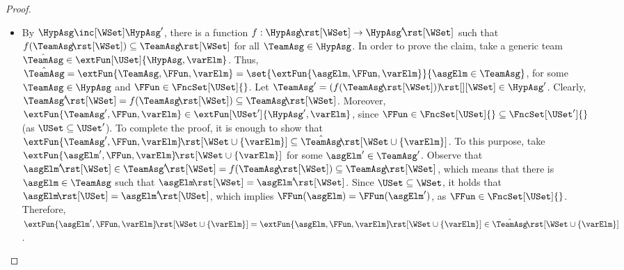 \documentclass[authoryear]{elsarticle}
\begin{document}
\begin{proof}
\begin{itemize}
  \item[\ref{lmm:mon(ext:dep)})]
    By $\HypAsg \inc[\WSet] \HypAsg'$, there is a function $f : \HypAsg
    \!\rst[\WSet] \rightarrow \HypAsg' \!\rst[\WSet]$ such that $f(\TeamAsg
    \!\rst[\WSet]) \subseteq \TeamAsg \!\rst[\WSet]$ for all $\TeamAsg \in
    \HypAsg$.
%
    In order to prove the claim, take a generic team $\hat{\TeamAsg} \in
    \extFun[\USet]{\HypAsg, \varElm}$.
    Thus, $\hat{\TeamAsg} = \extFun{\TeamAsg, \FFun, \varElm} =
    \set{\extFun{\asgElm, \FFun, \varElm}}{{ \asgElm \in \TeamAsg }}$, for some
    $\TeamAsg \in \HypAsg$ and $\FFun \in \FncSet[\USet]{}$.
%
    Let $\TeamAsg' = \asgExtW{(f(\TeamAsg \!\rst[\WSet]))} \in \HypAsg'$.
    Clearly, $\TeamAsg' \!\rst[\WSet] = f(\TeamAsg \!\rst[\WSet]) \subseteq
    \TeamAsg \!\rst[\WSet]$.
    Moreover, $\extFun{\TeamAsg', \FFun, \varElm} \in \extFun[\USet']{\HypAsg',
      \varElm}$, since $\FFun \in \FncSet[\USet]{} \subseteq \FncSet[\USet']{}$
    (as $\USet \subseteq \USet'$).
%
    To complete the proof, it is enough to show that $\extFun{\TeamAsg', \FFun,
      \varElm} \!\rst[\WSet \cup \{ \varElm \}] \subseteq \hat{\TeamAsg}
    \!\rst[\WSet \cup \{ \varElm \}]$.
    To this purpose, take $\extFun{\asgElm', \FFun, \varElm} \!\rst[\WSet \cup
    \{ \varElm \}]$ for some $\asgElm' \in \TeamAsg'$.
    Observe that $\asgElm' \!\rst[\WSet] \in \TeamAsg' \!\rst[\WSet] =
    f(\TeamAsg \!\rst[\WSet]) \subseteq \TeamAsg \!\rst[\WSet]$, which means
    that there is $\asgElm \in \TeamAsg$ such that $\asgElm \!\rst[\WSet] =
    \asgElm' \!\rst[\WSet]$.
    Since $\USet \subseteq \WSet$, it holds that $\asgElm \!\rst[\USet] =
    \asgElm' \!\rst[\USet]$, which implies $\FFun(\asgElm) = \FFun(\asgElm')$,
    as $\FFun \in \FncSet[\USet]{}$.
    Therefore, $\extFun{\asgElm', \FFun, \varElm} \!\rst[\WSet \cup \{ \varElm
    \}] = \extFun{\asgElm, \FFun, \varElm} \!\rst[\WSet \cup \{ \varElm \}] \in
    \hat{\TeamAsg} \!\rst[\WSet \cup \{ \varElm \}]$.

%


\end{itemize}
\end{proof}
\end{document}
